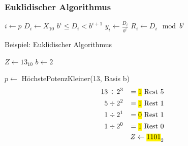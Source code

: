 \documentclass[a4paper]{scrartcl}
\begin{document}
	\subsubsection{Euklidischer Algorithmus}
		\begin{algorithm}[h]
			\DontPrintSemicolon
					
			\nl \( i \gets p \) \;
			\( D_i \gets X_{10} \) \;
			\( b^i \leq D_i < b^{i+1} \) 
			\BlankLine
			\nl \( y_i \gets \frac{D_i}{b^i} \) 
			\( R_i \gets D_i \mod b^i \) \;
			\BlankLine
			\nl {}
		\end{algorithm}
					 
		\begin{algorithm}[h]
			\caption{Beispiel: Euklidischer Algorithmus}
			\DontPrintSemicolon
					 		
			 		\( Z \gets 13_{10} \) 
			 		\( b \gets 2 \) \;
					\BlankLine
					 		
					 \( p \gets \) HöchstePotenzKleiner(13, Basis b) 
					 \BlankLine
					 \begin{align*}
					 	13 &\div 2^3 &= \text{\hl{$ 1 $} Rest } 5 \\
					 	5 &\div 2^2 &= \text{\hl{$ 1 $} Rest } 1 \\
					 	1 &\div 2^1 &= \text{\hl{$ 0 $} Rest } 1 \\
				 		1 &\div 2^0 &= \text{\hl{$ 1 $} Rest } 0 \\
			 			&& Z \gets \text{\hl{$ 1101$}}_2 
			 		\end{align*}
					\end{algorithm}
				 	
\end{document}
